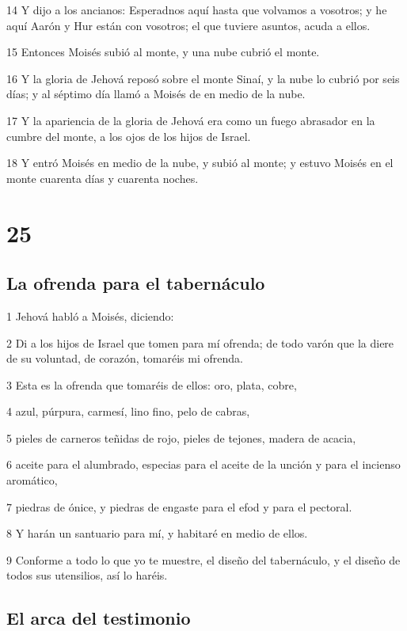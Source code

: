 \par 14 Y dijo a los ancianos: Esperadnos aquí hasta que volvamos a vosotros; y he aquí Aarón y Hur están con vosotros; el que tuviere asuntos, acuda a ellos.
\par 15 Entonces Moisés subió al monte, y una nube cubrió el monte.
\par 16 Y la gloria de Jehová reposó sobre el monte Sinaí, y la nube lo cubrió por seis días; y al séptimo día llamó a Moisés de en medio de la nube.
\par 17 Y la apariencia de la gloria de Jehová era como un fuego abrasador en la cumbre del monte, a los ojos de los hijos de Israel.
\par 18 Y entró Moisés en medio de la nube, y subió al monte; y estuvo Moisés en el monte cuarenta días y cuarenta noches.

\chapter{25}

\section*{La ofrenda para el tabernáculo}

\par 1 Jehová habló a Moisés, diciendo:
\par 2 Di a los hijos de Israel que tomen para mí ofrenda; de todo varón que la diere de su voluntad, de corazón, tomaréis mi ofrenda.
\par 3 Esta es la ofrenda que tomaréis de ellos: oro, plata, cobre,
\par 4 azul, púrpura, carmesí, lino fino, pelo de cabras,
\par 5 pieles de carneros teñidas de rojo, pieles de tejones, madera de acacia,
\par 6 aceite para el alumbrado, especias para el aceite de la unción y para el incienso aromático,
\par 7 piedras de ónice, y piedras de engaste para el efod y para el pectoral.
\par 8 Y harán un santuario para mí, y habitaré en medio de ellos.
\par 9 Conforme a todo lo que yo te muestre, el diseño del tabernáculo, y el diseño de todos sus utensilios, así lo haréis.

\section*{El arca del testimonio}

